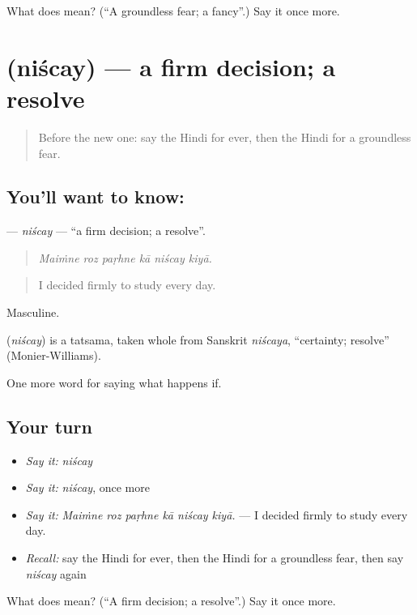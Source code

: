 \begin{tcolorbox}[breakable,colback=teal!4,colframe=teal!35!black,title={Before you move on}]
What does  mean? (\textquotedblleft{}A groundless fear; a fancy\textquotedblright{}.) Say it once more.
\end{tcolorbox}
\section[\texorpdfstring{\hi{निश्चय} (niścay)}{निश्चय (niścay)}]{ (niścay) — a firm decision; a resolve}

\label{lesson:HI-C556-niscay}



\begin{quote}
Before the new one: say the Hindi for ever, then the Hindi for a groundless fear.
\end{quote}

\subsection*{You'll want to know: }
\textbf{} — \emph{niścay} — \textquotedblleft{}a firm decision; a resolve\textquotedblright{}.

\begin{quote}
     
\end{quote}

\begin{quote}
\emph{Maiṁne roz paṛhne kā niścay kiyā.}
\end{quote}

\begin{quote}
I decided firmly to study every day.
\end{quote}

Masculine.

\begin{cousinweb}
\textbf{} (\emph{niścay}) is a tatsama, taken whole from Sanskrit \emph{niścaya}, \textquotedblleft{}certainty; resolve\textquotedblright{} (Monier-Williams).
\end{cousinweb}

\begin{grammarlens}[title={What you've built}]
One more word for saying what happens if.
\end{grammarlens}

\subsection*{Your turn}
\begin{itemize}
\raggedright
  \item \emph{Say it:} \emph{niścay}
  \item \emph{Say it:} \emph{niścay}, once more
  \item \emph{Say it:} \emph{Maiṁne roz paṛhne kā niścay kiyā.} — I decided firmly to study every day.
  \item \emph{Recall:} say the Hindi for ever, then the Hindi for a groundless fear, then say \emph{niścay} again
\end{itemize}

\begin{tcolorbox}[breakable,colback=teal!4,colframe=teal!35!black,title={Before you move on}]
What does  mean? (\textquotedblleft{}A firm decision; a resolve\textquotedblright{}.) Say it once more.
\end{tcolorbox}
